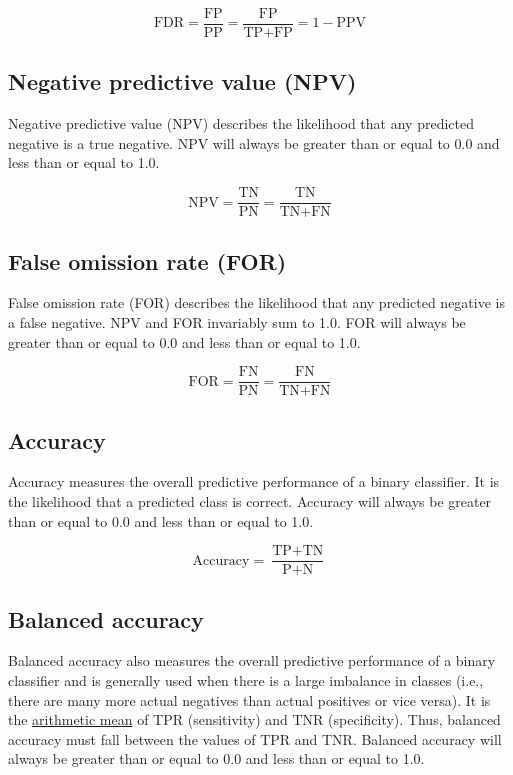 \documentclass[letterpaper, 12pt]{article}
\begin{document}
$$\textrm{FDR} = \frac{\textrm{FP}}{\textrm{PP}} = \frac{\textrm{FP}}{\textrm{TP} + \textrm{FP}} = 1 - \textrm{PPV}$$

\subsection*{Negative predictive value (NPV)}

Negative predictive value (NPV) describes the likelihood that any predicted negative is a true negative. NPV will always be greater than or equal to 0.0 and less than or equal to 1.0.

$$\textrm{NPV} = \frac{\textrm{TN}}{\textrm{PN}} = \frac{\textrm{TN}}{\textrm{TN} + \textrm{FN}}$$

\subsection*{False omission rate (FOR)}

False omission rate (FOR) describes the likelihood that any predicted negative is a false negative. NPV and FOR invariably sum to 1.0. FOR will always be greater than or equal to 0.0 and less than or equal to 1.0.

$$\textrm{FOR} = \frac{\textrm{FN}}{\textrm{PN}} = \frac{\textrm{FN}}{\textrm{TN} + \textrm{FN}}$$

\subsection*{Accuracy}

Accuracy measures the overall predictive performance of a binary classifier. It is the likelihood that a predicted class is correct. Accuracy will always be greater than or equal to 0.0 and less than or equal to 1.0.

$$\textrm{Accuracy} = \frac{\textrm{TP} + \textrm{TN}}{\textrm{P} + \textrm{N}}$$

\subsection*{Balanced accuracy}

Balanced accuracy also measures the overall predictive performance of a binary classifier and is generally used when there is a large imbalance in classes (i.e., there are many more actual negatives than actual positives or vice versa). It is the \href{https://en.wikipedia.org/wiki/Arithmetic_mean}{arithmetic mean} of TPR (sensitivity) and TNR (specificity). Thus, balanced accuracy must fall between the values of TPR and TNR. Balanced accuracy will always be greater than or equal to 0.0 and less than or equal to 1.0.
\end{document}
